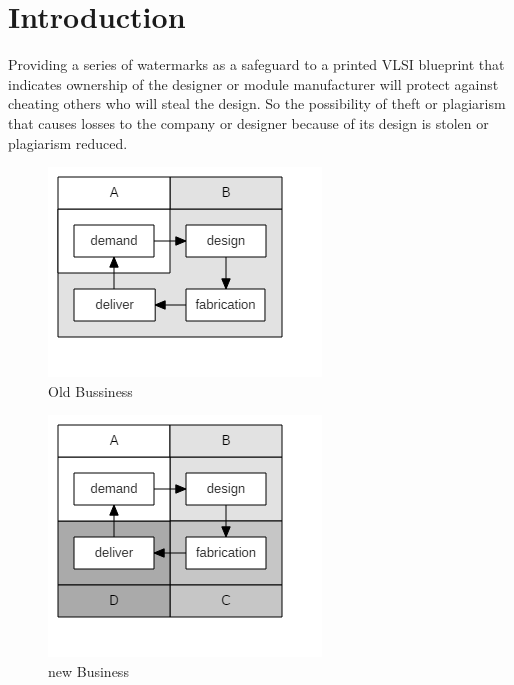 \documentclass[10pt,journal,compsoc,letterpaper,final]{IEEEtran}
\begin{document}
	\section{Introduction}
	\label{sec:introduction}
\fi

Providing a series of watermarks as a safeguard to a printed VLSI blueprint that indicates ownership of the designer or module manufacturer will protect against cheating others who will steal the design. So the possibility of theft or plagiarism that causes losses to the company or designer because of its design is stolen or plagiarism reduced.\cite{IEEEhowto:kopka}

\begin{figure}
	\centering
	\includegraphics[scale=0.5]{images/oldBusinessLSI}
	\caption{Old Bussiness}
	\label{oldb}
\end{figure}

\begin{figure}
	\centering
	\includegraphics[scale=0.5]{images/newBusinessLSI}
	\caption{new Business}
	\label{newb}
\end{figure}
\end{document}
